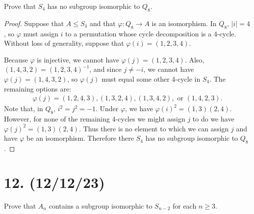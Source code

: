 \documentclass{article}
\begin{document}
Prove that $S_4$ has no subgroup isomorphic to $Q_8$.

\begin{proof}
    Suppose that $A \leq S_4$ and that $\varphi: Q_8 \rightarrow A$ is an isomorphism. In $Q_8$, $|i| = 4$, so $\varphi$ must assign $i$ to a permutation whose cycle decomposition is a 4-cycle. Without loss of generality, suppose that $\varphi(i) = (1, 2, 3, 4)$. 
    
    
    Because $\varphi$ is injective, we cannot have $\varphi(j) = (1, 2, 3, 4)$. Also, $(1, 4, 3, 2) = (1, 2, 3, 4)^{-1}$, and since $j \neq -i$, we cannot have $\varphi(j) = (1, 4, 3, 2)$, so $\varphi(j)$ must equal some other 4-cycle in $S_4$. The remaining options are:
    \begin{align*}
        \varphi(j) = (1, 2, 4, 3), (1, 3, 2, 4), (1, 3, 4, 2), \text{ or } (1, 4, 2, 3).
    \end{align*}
    Note that, in $Q_8$, $i^2 = j^2 = -1$. Under $\varphi$, we have $\varphi(i)^2 = (1, 3)(2, 4)$. However, for none of the remaining 4-cycles we might assign $j$ to do we have $\varphi(j)^2 = (1, 3)(2, 4)$. Thus there is no element to which we can assign $j$ and have $\varphi$ be an isomorphism. Therefore there $S_4$ has no subgroup isomorphic to $Q_8$.
\end{proof}

\section*{12. (12/12/23)}

Prove that $A_n$ contains a subgroup isomorphic to $S_{n - 2}$ for each $n \geq 3$.
\end{document}
